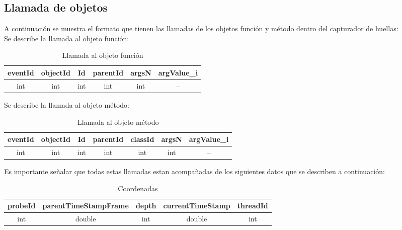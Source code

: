 \documentclass[10pt,a4paper]{article}
\begin{document}
\newpage
\subsection{Llamada de objetos}

A continuación se muestra el formato que tienen las llamadas de los objetos función y método dentro del capturador de huellas:\\

Se describe la llamada al objeto función:\\

\begin{table}[!h]
\begin{center}
\begin{tabular}{| c | c | c | c | c | c |}
\hline
eventId & objectId & Id & parentId & argsN & argValue_{i}\\
\hline
int & int & int & int & int & --\footnotemark[1]\\
\hline
\end{tabular}
\caption{Llamada al objeto función} 
\end{center}
\end{table}

Se describe la llamada al objeto método:\\

\begin{table}[!h]
\begin{center}
\begin{tabular}{| c | c | c | c | c | c | c |}
\hline
eventId & objectId & Id & parentId & classId & argsN & argValue_{i}\\
\hline
int & int & int & int & int & int & --\footnotemark[1]\\
\hline
\end{tabular}
\caption{Llamada al objeto método} 
\end{center}
\end{table}

Es importante señalar que todas estas llamadas estan acompañadas de los siguientes datos que se describen a continuación:\\

\begin{table}[!h]
\begin{center}
\begin{tabular}{| c | c | c | c | c |}
\hline
probeId & parentTimeStampFrame & depth & currentTimeStamp & threadId\\
\hline
int & double & int & double & int \\
\hline
\end{tabular}
\caption{Coordenadas} 
\end{center}
\end{table}
\end{document}
